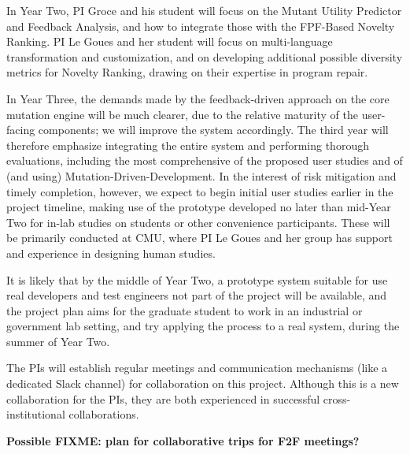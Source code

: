 \documentclass[11pt]{article}
\begin{document}
In Year Two, PI Groce and his student will focus on the Mutant Utility Predictor
and Feedback Analysis, and how to integrate those with the FPF-Based Novelty
Ranking.  PI Le Goues and her student will focus on multi-language
transformation and customization, and on developing additional possible
diversity metrics for Novelty Ranking, drawing on their expertise in program
repair.

In Year Three, the demands made by the feedback-driven approach on the core
mutation engine will be much clearer, due to the relative maturity of the
user-facing components; we will improve the system accordingly.  The third year
will therefore emphasize integrating the entire system and performing thorough
evaluations, including the most comprehensive of the proposed user studies and
of (and using) Mutation-Driven-Development.
In the interest of risk mitigation and timely completion, however, we expect to
begin initial user studies earlier in the project timeline, making use of the
prototype developed no later than mid-Year Two for in-lab studies on students or
other convenience participants.  These will be primarily conducted at CMU, where
PI Le Goues and her group has support and experience in designing human
studies. 

It is likely that
by the middle of Year Two, a prototype system suitable for use real
developers and test engineers not part of the project will be available, and the
project plan aims for the graduate student to work in an industrial or
government lab setting, and try applying the process to a real system, during
the summer of Year Two.

The PIs will establish regular meetings and communication mechanisms (like a
dedicated Slack channel) for collaboration on this project.  Although this is a
new collaboration for the PIs, they are both experienced in successful
cross-institutional collaborations.  

\textbf{Possible FIXME: plan for collaborative trips for F2F meetings?}
\end{document}
